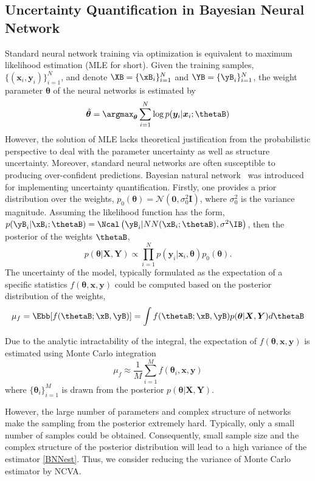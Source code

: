 \documentclass[runningheads]{llncs}
\begin{document}
\subsection{Uncertainty Quantification in Bayesian Neural Network}
Standard neural network training via optimization is equivalent to maximum likelihood estimation (MLE for short). Given the training samples, $\{(\bm{x}_i, \bm{y}_i)\}_{i=1}^N$, and denote $\XB = \{ \xB_i\}_{i=1}^N$ and $\YB = \{ \yB_i\}_{i=1}^N$, the weight parameter $\bm{\theta}$ of the neural networks is estimated by
\begin{equation}
\hat{\bm{\theta}} = \argmax_{\bm{\theta} } \sum_{i=1}^N \log p (\bm{y}_i |\bm{x}_i; \thetaB)
\end{equation}
However, the solution of MLE lacks theoretical justification from the probabilistic perspective to deal with the parameter uncertainty as well as structure uncertainty. Moreover, standard neural networks are  often susceptible to producing  over-confident predictions. Bayesian natural network~\cite{neal2012bayesian} was introduced for implementing uncertainty quantification. 
Firstly, one provides a prior distribution over the weights, 
$p_0(\bm{\theta}) = \mathcal{N}(\bm{0}, \sigma_0^2 \bm{I}) $, 
where $\sigma_0^2$ is the variance magnitude. Assuming the likelihood function has the form, $p(\yB_i | \xB_i; \thetaB) = \Ncal \left( \yB_i | NN(\xB_i; \thetaB), \sigma^2 \IB \right)$, then the posterior of the weights
$\thetaB$, 
$$
p(\bm{\theta}| \bm{X}, \bm{Y}) \propto \prod_{i=1}^N p(\bm{y}_i |\bm{x}_i, \bm{\theta})p_0( \bm{\theta}).
$$ 
The uncertainty of the model, typically formulated as the expectation of a specific statistics $f(\bm{\theta},\bm{x}, \bm{y})$ could be computed based on the posterior distribution of the weights, 
\begin{equation}
\mu_{f}  = \Ebb[f(\thetaB;\xB, \yB)] = \int f(\thetaB;\xB, \yB) p(\bm{\theta}| \bm{X}, \bm{Y}) d \thetaB
\end{equation}

Due to the analytic intractability of the integral, the expectation of $f(\bm{\theta}, \bm{x}, \bm{y})$ is estimated using Monte Carlo integration
\begin{equation}\label{BNNest}
\mu_{f}  \approx \frac{1}{M}\sum_{i=1}^M f(\bm{\theta}_i, \bm{x}, \bm{y})
\end{equation}
where $\{ \bm{\theta}_i \}_{i=1}^M$ is drawn from the posterior $p(\bm{\theta} | \bm{X}, \bm{Y})$. 

However, the large number of parameters and complex structure of networks make the sampling from the posterior extremely hard. Typically, only a small number of samples could be obtained.  Consequently, small sample size and the complex structure of the posterior distribution will lead to a high variance of the estimator \eqref{BNNest}. Thus, we consider reducing the variance of Monte Carlo estimator by NCVA. 
\end{document}
